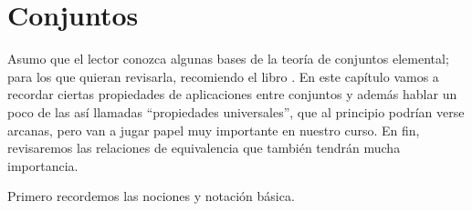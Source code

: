 \chapter{Conjuntos}
\label{cap:conjuntos}

\ifdefined\separatechapter\bookbanner\fi

Asumo que el lector conozca algunas bases de la teoría de conjuntos elemental;
para los que quieran revisarla, recomiendo el libro
\cite{Shen-Vereshchagin-2002}. En este capítulo vamos a recordar ciertas
propiedades de aplicaciones entre conjuntos y además hablar un poco de las así
llamadas ``propiedades universales'', que al principio podrían verse arcanas,
pero van a jugar papel muy importante en nuestro curso. En fin, revisaremos
las relaciones de equivalencia que también tendrán mucha importancia.

\vspace{1em}

Primero recordemos las nociones y notación básica.


